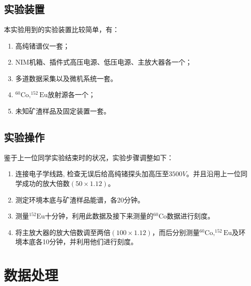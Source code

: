 \documentclass{article}
\begin{document}
\section{}
\subsection{实验装置}
本实验用到的实验装置比较简单，有：
\begin{enumerate}
    \item 高纯锗谱仪一套；
    \item NIM机箱、插件式高压电源、低压电源、主放大器各一个；
    \item 多道数据采集以及微机系统一套。
    \item $^{60}\text{Co},^{152}\text{Eu}$放射源各一个；
    \item 未知矿渣样品及固定装置一套。
\end{enumerate}
\subsection{实验操作}
鉴于上一位同学实验结束时的状况，实验步骤调整如下：
\begin{enumerate}
    \item 连接电子学线路,
检查无误后给高纯锗探头加高压至$3500\si{V}$。并且沿用上一位同学成功的放大倍数$(50\times1.12)$。
    \item 测定环境本底与矿渣样品能谱，各20分钟。
    \item 测量$^{152}\text{Eu}$十分钟，利用此数据及接下来测量的$^{60}\text{Co}$数据进行刻度。
    \item 将主放大器的放大倍数调至两倍$(100\times 1.12)$，而后分别测量$^{60}\text{Co},^{152}\text{Eu}$及环境本底各10分钟，并利用他们进行刻度。
\end{enumerate}
\section{数据处理}
\end{document}
